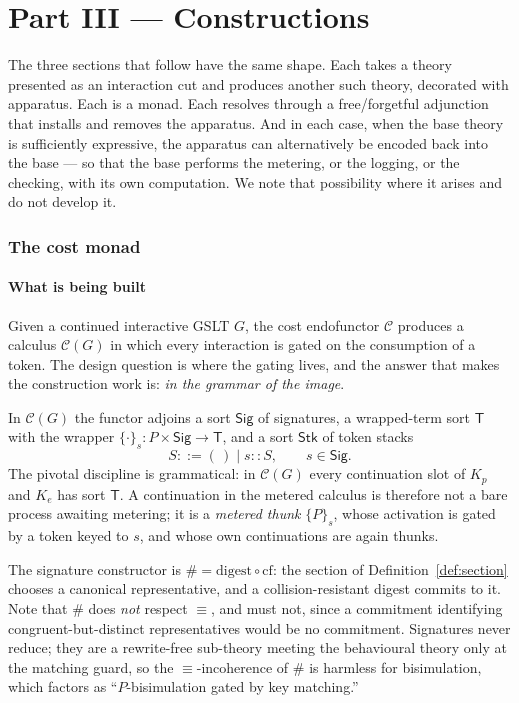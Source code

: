 \documentclass[11pt]{article}
\theoremstyle{definition}
\theoremstyle{plain}
\theoremstyle{remark}
\newcommand{\Sig}{\mathsf{Sig}}
\newcommand{\Stk}{\mathsf{Stk}}
\newcommand{\Tw}{\mathsf{T}}
\newcommand{\cost}{\mathcal{C}}
\newcommand{\cf}{\mathrm{cf}}
\begin{document}
\part*{Part III --- Constructions}

The three sections that follow have the same shape. Each takes a theory presented as an
interaction cut and produces another such theory, decorated with apparatus. Each is a
monad. Each resolves through a free/forgetful adjunction that installs and removes the
apparatus. And in each case, when the base theory is sufficiently expressive, the
apparatus can alternatively be encoded back into the base --- so that the base performs
the metering, or the logging, or the checking, with its own computation. We note that
possibility where it arises and do not develop it.

\section{The cost monad}
\label{sec:cost}

\subsection{What is being built}

Given a continued interactive GSLT $G$, the cost endofunctor $\cost$ produces a calculus
$\cost(G)$ in which every interaction is gated on the consumption of a token. The design
question is where the gating lives, and the answer that makes the construction work is:
\emph{in the grammar of the image}.

In $\cost(G)$ the functor adjoins a sort $\Sig$ of signatures, a wrapped-term sort $\Tw$
with the wrapper $\{\cdot\}_s : P \times \Sig \to \Tw$, and a sort $\Stk$ of token stacks
\[
  S ::= (\,) \mid s :: S, \qquad s \in \Sig .
\]
The pivotal discipline is grammatical: in $\cost(G)$ every continuation slot of $K_p$ and
$K_e$ has sort $\Tw$. A continuation in the metered calculus is therefore not a bare
process awaiting metering; it is a \emph{metered thunk} $\{P\}_s$, whose activation is
gated by a token keyed to $s$, and whose own continuations are again thunks.

The signature constructor is $\# = \mathrm{digest} \circ \cf$: the section of
Definition~\ref{def:section} chooses a canonical representative, and a collision-resistant
digest commits to it. Note that $\#$ does \emph{not} respect $\equiv$, and must not,
since a commitment identifying congruent-but-distinct representatives would be no
commitment. Signatures never reduce; they are a rewrite-free sub-theory meeting the
behavioural theory only at the matching guard, so the $\equiv$-incoherence of $\#$ is
harmless for bisimulation, which factors as ``$P$-bisimulation gated by key matching.''
\end{document}
